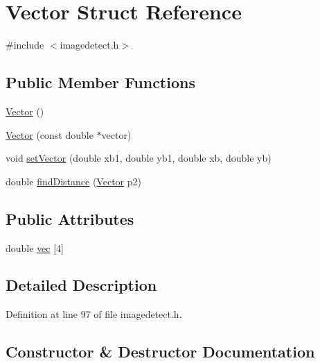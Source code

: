 \hypertarget{struct_vector}{}\section{Vector Struct Reference}
\label{struct_vector}


{\ttfamily \#include $<$imagedetect.\+h$>$}

\subsection*{Public Member Functions}
\begin{DoxyCompactItemize}
\item 
\mbox{\hyperlink{struct_vector_a6f80c73b5f18dcf3f8e36065bdc8b9e5}{Vector}} ()
\item 
\mbox{\hyperlink{struct_vector_a431b04a497a5ac4b65717f2f673aa306}{Vector}} (const double $\ast$vector)
\item 
void \mbox{\hyperlink{struct_vector_a07b5927e2fd524265a592b8c911a9231}{set\+Vector}} (double xb1, double yb1, double xb, double yb)
\item 
double \mbox{\hyperlink{struct_vector_a42534c51ed36bbe7286464c30d50b042}{find\+Distance}} (\mbox{\hyperlink{struct_vector}{Vector}} p2)
\end{DoxyCompactItemize}
\subsection*{Public Attributes}
\begin{DoxyCompactItemize}
\item 
double \mbox{\hyperlink{struct_vector_a9cb2759ae83b5b1da332646ec8cb1414}{vec}} \mbox{[}4\mbox{]}
\end{DoxyCompactItemize}


\subsection{Detailed Description}


Definition at line 97 of file imagedetect.\+h.



\subsection{Constructor \& Destructor Documentation}
\mbox{\label{struct_vector_a6f80c73b5f18dcf3f8e36065bdc8b9e5}} 
